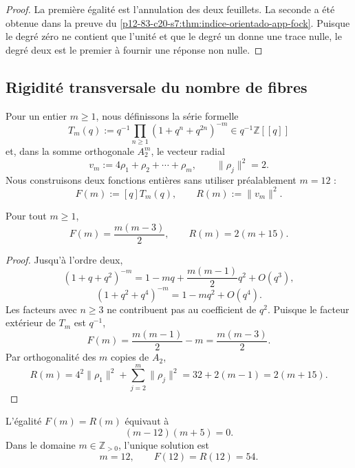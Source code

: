 \begin{proof}
La première égalité est l'annulation des deux feuillets. La seconde a été
obtenue dans la preuve du \cref{p12-83-c20-s7:thm:indice-orientado-app-fock}. Puisque le degré
zéro ne contient que l'unité et que le degré un donne une trace nulle, le degré deux est
le premier à fournir une réponse non nulle.
\end{proof}

\subsection{Rigidité transversale du nombre de fibres}

Pour un entier \(m\ge1\), nous définissons la série formelle
\begin{equation}
 T_m(q):=
 q^{-1}\prod_{n\ge1}(1+q^n+q^{2n})^{-m}
 \in q^{-1}\mathbb Z[[q]]
 \label{p12-83-c20-s7:eq:familia-fock-m-fibras-u030}
\end{equation}
et, dans la somme orthogonale \(A_2^m\), le vecteur radial
\begin{equation}
 v_m:=4\rho_1+\rho_2+\cdots+\rho_m,
 \qquad
 \|\rho_j\|^2=2.
 \label{p12-83-c20-s7:eq:familia-radial-m-fibras-u030}
\end{equation}
Nous construisons deux fonctions entières sans utiliser préalablement \(m=12\) :
\[
 F(m):=[q]T_m(q),
 \qquad
 R(m):=\|v_m\|^2.
\]

\begin{proposition}
\label{p12-83-c20-s7:prop:dos-funciones-rigidez-doce-u030}
Pour tout \(m\ge1\),
\begin{equation}
 F(m)=\frac{m(m-3)}2,
 \qquad
 R(m)=2(m+15).
 \label{p12-83-c20-s7:eq:funciones-rigidez-doce-u030}
\end{equation}
\end{proposition}

\begin{proof}
Jusqu'à l'ordre deux,
\[
 (1+q+q^2)^{-m}
 =1-mq+\frac{m(m-1)}2q^2+O(q^3),
\]
\[
 (1+q^2+q^4)^{-m}=1-mq^2+O(q^4).
\]
Les facteurs avec \(n\ge3\) ne contribuent pas au coefficient de \(q^2\).
Puisque le facteur extérieur de \(T_m\) est \(q^{-1}\),
\[
 F(m)=\frac{m(m-1)}2-m=\frac{m(m-3)}2.
\]
Par orthogonalité des \(m\) copies de \(A_2\),
\[
 R(m)=4^2\|\rho_1\|^2+
 \sum_{j=2}^{m}\|\rho_j\|^2
 =32+2(m-1)=2(m+15).
\]
\end{proof}

\begin{theorem}
\label{p12-83-c20-s7:thm:rigidez-transversal-doce-u030}
L'égalité \(F(m)=R(m)\) équivaut à
\begin{equation}
 (m-12)(m+5)=0.
 \label{p12-83-c20-s7:eq:ecuacion-rigidez-doce-u030}
\end{equation}
Dans le domaine \(m\in\mathbb Z_{>0}\), l'unique solution est
\[
 \boxed{m=12,\qquad F(12)=R(12)=54.}
\]
\end{theorem}

